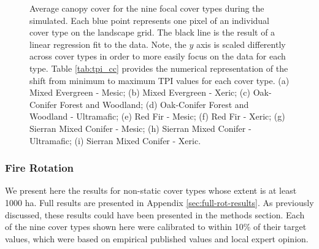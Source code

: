 \begin{figure}[!htbp]
  \centering


  \caption{Average canopy cover for the nine focal cover types during the simulated. Each blue point represents one pixel of an individual cover type on the landscape grid. The black line is the result of a linear regression fit to the data. Note, the $y$ axis is scaled differently across cover types in order to more easily focus on the data for each type. Table \ref{tab:tpi_cc} provides the numerical representation of the shift from minimum to maximum TPI values for each cover type. (a) Mixed Evergreen - Mesic; (b) Mixed Evergreen - Xeric; (c) Oak-Conifer Forest and Woodland; (d) Oak-Conifer Forest and Woodland - Ultramafic; (e) Red Fir - Mesic; (f) Red Fir - Xeric; (g) Sierran Mixed Conifer - Mesic; (h) Sierran Mixed Conifer - Ultramafic; (i) Sierran Mixed Conifer - Xeric.}
  \label{fig:tpi_cc}
\end{figure}



\newpage
\subsubsection{Fire Rotation}
We present here the results for non-static cover types whose extent is at least 1000 ha. Full results are presented in Appendix \ref{sec:full-rot-results}. As previously discussed, these results could have been presented in the methods section. Each of the nine cover types shown here were calibrated to within 10\% of their target values, which were based on empirical published values and local expert opinion.

